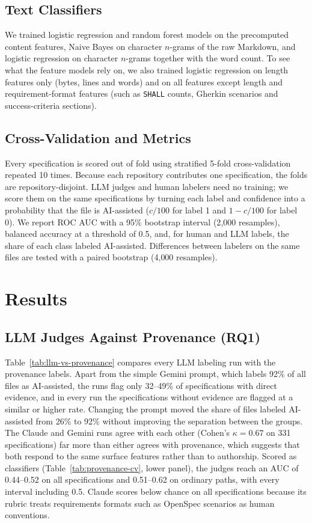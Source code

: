 \documentclass{article}
\begin{document}
\subsection{Text Classifiers}
We trained logistic regression and random forest models on the precomputed content features, Naive Bayes on character $n$-grams of the raw Markdown, and logistic regression on character $n$-grams together with the word count. To see what the feature models rely on, we also trained logistic regression on length features only (bytes, lines and words) and on all features except length and requirement-format features (such as \texttt{SHALL} counts, Gherkin scenarios and success-criteria sections).

\subsection{Cross-Validation and Metrics}
Every specification is scored out of fold using stratified 5-fold cross-validation repeated 10 times. Because each repository contributes one specification, the folds are repository-disjoint. LLM judges and human labelers need no training; we score them on the same specifications by turning each label and confidence into a probability that the file is AI-assisted ($c/100$ for label 1 and $1 - c/100$ for label 0). We report ROC AUC with a 95\% bootstrap interval (2{,}000 resamples), balanced accuracy at a threshold of 0.5, and, for human and LLM labels, the share of each class labeled AI-assisted. Differences between labelers on the same files are tested with a paired bootstrap (4{,}000 resamples).

\section{Results}
\subsection{LLM Judges Against Provenance (RQ1)}
Table~\ref{tab:llm-vs-provenance} compares every LLM labeling run with the provenance labels. Apart from the simple Gemini prompt, which labels 92\% of all files as AI-assisted, the runs flag only 32--49\% of specifications with direct evidence, and in every run the specifications without evidence are flagged at a similar or higher rate. Changing the prompt moved the share of files labeled AI-assisted from 26\% to 92\% without improving the separation between the groups. The Claude and Gemini runs agree with each other (Cohen's $\kappa = 0.67$ on 331 specifications) far more than either agrees with provenance, which suggests that both respond to the same surface features rather than to authorship. Scored as classifiers (Table~\ref{tab:provenance-cv}, lower panel), the judges reach an AUC of 0.44--0.52 on all specifications and 0.51--0.62 on ordinary paths, with every interval including 0.5. Claude scores below chance on all specifications because its rubric treats requirements formats such as OpenSpec scenarios as human conventions.
\end{document}
